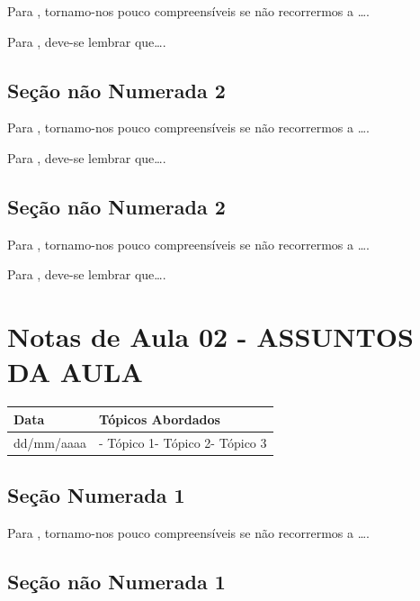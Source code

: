 \documentclass[
]{book}
\begin{document}
Para \citet{BOCK2001}, tornamo-nos pouco compreensíveis se não recorrermos a \ldots.

Para \citet{DAVIDOFF2001}, deve-se lembrar que\ldots.

\hypertarget{seuxe7uxe3o-nuxe3o-numerada-2-46}{%
\subsection*{Seção não Numerada 2}\label{seuxe7uxe3o-nuxe3o-numerada-2-46}}

Para \citet{BOCK2001}, tornamo-nos pouco compreensíveis se não recorrermos a \ldots.

Para \citet{DAVIDOFF2001}, deve-se lembrar que\ldots.

\hypertarget{seuxe7uxe3o-nuxe3o-numerada-2-47}{%
\subsection*{Seção não Numerada 2}\label{seuxe7uxe3o-nuxe3o-numerada-2-47}}

Para \citet{BOCK2001}, tornamo-nos pouco compreensíveis se não recorrermos a \ldots.

Para \citet{DAVIDOFF2001}, deve-se lembrar que\ldots.

\hypertarget{notas-de-aula-02---assuntos-da-aula-1}{%
\section{Notas de Aula 02 - ASSUNTOS DA AULA}\label{notas-de-aula-02---assuntos-da-aula-1}}

\begin{longtable}[]{@{}ll@{}}
\toprule()
Data & Tópicos Abordados \\
\midrule()
\endhead
dd/mm/aaaa & - Tópico 1- Tópico 2- Tópico 3 \\
\bottomrule()
\end{longtable}

\hypertarget{seuxe7uxe3o-numerada-1-16}{%
\subsection{Seção Numerada 1}\label{seuxe7uxe3o-numerada-1-16}}

Para \citet{BOCK2001}, tornamo-nos pouco compreensíveis se não recorrermos a \ldots.

\hypertarget{seuxe7uxe3o-nuxe3o-numerada-1-32}{%
\subsection*{Seção não Numerada 1}\label{seuxe7uxe3o-nuxe3o-numerada-1-32}}
\end{document}
